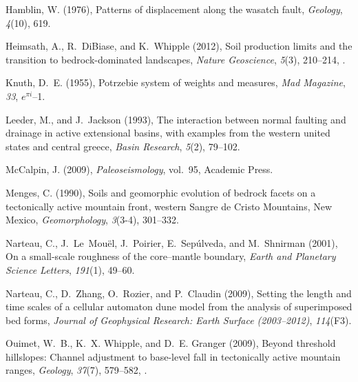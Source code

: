 \begin{thebibliography}{50}
Hamblin, W. (1976), Patterns of displacement along the wasatch fault,
  \textit{Geology}, \textit{4}(10), 619.

Heimsath, A., R.~DiBiase, and K.~Whipple (2012), Soil production limits and the
  transition to bedrock-dominated landscapes, \textit{Nature Geoscience},
  \textit{5}(3), 210--214, .

Knuth, D.~E. (1955), Potrzebie system of weights and measures, \textit{Mad
  Magazine}, \textit{33}, $e^{\pi i}$--1.

Leeder, M., and J.~Jackson (1993), The interaction between normal faulting and
  drainage in active extensional basins, with examples from the western united
  states and central greece, \textit{Basin Research}, \textit{5}(2), 79--102.

McCalpin, J. (2009), \textit{Paleoseismology}, vol.~95, Academic Press.

Menges, C. (1990), {Soils and geomorphic evolution of bedrock facets on a
  tectonically active mountain front, western Sangre de Cristo Mountains, New
  Mexico}, \textit{Geomorphology}, \textit{3}(3-4), 301--332.

Narteau, C., J.~Le~Mou{\"e}l, J.~Poirier, E.~Sep{\'u}lveda, and M.~Shnirman
  (2001), On a small-scale roughness of the core--mantle boundary,
  \textit{Earth and Planetary Science Letters}, \textit{191}(1), 49--60.

Narteau, C., D.~Zhang, O.~Rozier, and P.~Claudin (2009), Setting the length and
  time scales of a cellular automaton dune model from the analysis of
  superimposed bed forms, \textit{Journal of Geophysical Research: Earth
  Surface (2003--2012)}, \textit{114}(F3).

Ouimet, W.~B., K.~X. Whipple, and D.~E. Granger (2009), Beyond threshold
  hillslopes: Channel adjustment to base-level fall in tectonically active
  mountain ranges, \textit{Geology}, \textit{37}(7), 579--582,
  .


\end{thebibliography}
